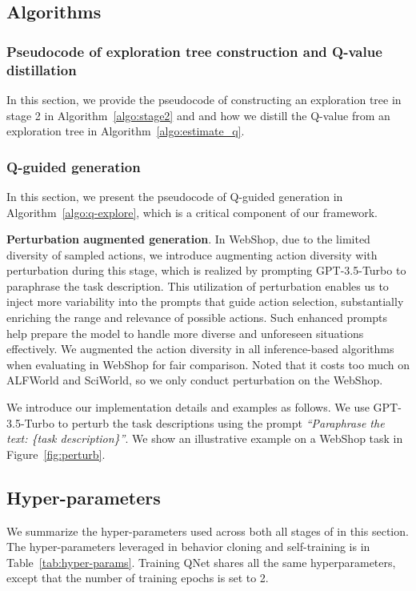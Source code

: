 \subsection{Algorithms}


\subsubsection{Pseudocode of exploration tree construction and Q-value distillation}\label{appdix:pseudocode_of_stage2}

In this section, we provide the pseudocode of constructing an exploration tree in stage 2 in Algorithm~\ref{algo:stage2} and and how we distill the Q-value from an exploration tree in Algorithm~\ref{algo:estimate_q}.




\subsubsection{Q-guided generation}\label{appendix:q-explore}
In this section, we present the pseudocode of Q-guided generation in Algorithm~\ref{algo:q-explore}, which is a critical component of our framework.


\label{method:perturb}\textbf{Perturbation augmented generation}. In WebShop, due to the limited diversity of sampled actions, we introduce augmenting action diversity with perturbation during this stage, which is realized by prompting GPT-3.5-Turbo to paraphrase the task description. This utilization of perturbation enables us to inject more variability into the prompts that guide action selection, substantially enriching the range and relevance of possible actions. Such enhanced prompts help prepare the model to handle more diverse and unforeseen situations effectively. We augmented the action diversity in all inference-based algorithms when evaluating in WebShop for fair comparison. Noted that it costs too much on ALFWorld and SciWorld, so we only conduct perturbation on the WebShop.

We introduce our implementation details and examples as follows. We use GPT-3.5-Turbo to perturb the task descriptions using the prompt \textit{``Paraphrase the text: \{task description\}''}. We show an illustrative example on a WebShop task in Figure~\ref{fig:perturb}.

\subsection{Hyper-parameters}

We summarize the hyper-parameters used across both all stages of {\ours} in this section.
The hyper-parameters leveraged in behavior cloning and self-training is in Table~\ref{tab:hyper-params}. Training QNet shares all the same hyperparameters, except that the number of training epochs is set to 2.





